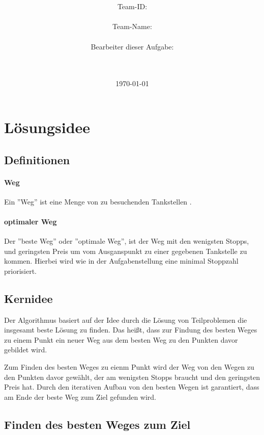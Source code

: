 \documentclass[a4paper,10pt,ngerman]{scrartcl}
\title{\textbf{\Huge\Aufgabe}}
\author{\LARGE Team-ID: \LARGE \TeamID \\\\
	    \LARGE Team-Name: \LARGE \TeamName \\\\
	    \LARGE Bearbeiter dieser Aufgabe: \\ 
	    \LARGE \Namen\\\\}
\date{\LARGE\today}
\begin{document}
\maketitle
\tableofcontents

\vspace{0.5cm}

\section{Lösungsidee}

\subsection{Definitionen}

\paragraph{Weg}

Ein ''Weg'' ist eine Menge von zu besuchenden Tankstellen .

\paragraph{optimaler Weg}

Der ''beste Weg'' oder ''optimale Weg'', ist der Weg mit den wenigsten Stopps, und geringsten Preis um vom Ausganspunkt zu einer gegebenen Tankstelle zu kommen.
Hierbei wird wie in der Aufgabenstellung eine minimal Stoppzahl priorisiert.

\subsection{Kernidee}

Der Algorithmus basiert auf der Idee durch die Lösung von Teilproblemen die insgesamt beste Lösung zu finden.
Das heißt, dass zur Findung des besten Weges zu einem Punkt ein neuer Weg aus dem besten Weg zu den Punkten davor gebildet wird.
 
Zum Finden des besten Weges zu eienm Punkt wird der Weg von den Wegen zu den Punkten davor gewählt, der am wenigsten Stopps braucht und den geringsten Preis hat.
Durch den iterativen Aufbau von den besten Wegen ist garantiert, dass am Ende der beste Weg zum Ziel gefunden wird.

\subsection{Finden des besten Weges zum Ziel}
\end{document}

